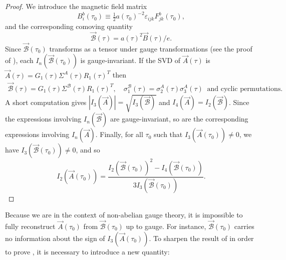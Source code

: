 \begin{proof}
We introduce the magnetic field matrix 
\begin{equation}
B_{i}^{b}(\tau_{0})\equiv\tfrac{1}{2}a(\tau_{0})^{-2}\varepsilon_{ijk}F_{jk}^{b}(\tau_{0}),\label{eq:B-def}
\end{equation}
 and the corresponding comoving quantity 
\begin{equation}
\vec{\mathcal{B}}(\tau)=a(\tau)^{2}\vec{B}(\tau)/e.\label{eq:cal-B}
\end{equation}
Since $\vec{\mathcal{B}}(\tau_{0})$ transforms as a tensor under gauge transformations (see the proof of ), each $I_{n}(\vec{\mathcal{B}}(\tau_{0}))$ is gauge-invariant. If the SVD of $\vec{A}(\tau)$ is $\vec{A}(\tau)=G_{1}(\tau)\Sigma^{A}(\tau)R_{1}(\tau)^{T}$ then
\begin{gather}
\vec{\mathcal{B}}(\tau)=G_{1}(\tau)\Sigma^{\mathcal{B}}(\tau)R_{1}(\tau)^{T},\quad\sigma_{1}^{\mathcal{B}}(\tau)=\sigma_{2}^{A}(\tau)\sigma_{3}^{A}(\tau)\ \textrm{ and cyclic permutations}.\label{eq:SV-AB}
\end{gather}
A short computation gives $\left|I_{3}(\vec{A})\right|=\sqrt{I_{3}(\vec{\mathcal{B}})}$ and $I_{4}(\vec{A})=I_{2}(\vec{\mathcal{B}})$. Since the expressions involving $I_{n}(\vec{\mathcal{B}})$ are gauge-invariant, so are the corresponding expressions involving $I_{n}(\vec{A})$. Finally, for all $\tau_{0}$ such that $I_{3}(\vec{A}(\tau_{0}))\neq0$, we have $I_{3}(\vec{\mathcal{B}}(\tau_{0}))\neq0$, and so 
\[
I_{2}(\vec{A}(\tau_{0}))=\frac{I_{2}(\vec{\mathcal{B}}(\tau_{0}))^{2}-I_{4}(\vec{\mathcal{B}}(\tau_{0}))}{3I_{3}(\vec{\mathcal{B}}(\tau_{0}))}.
\]
\end{proof}
Because we are in the context of non-abelian gauge theory, it is impossible to fully reconstruct $\vec{A}(\tau_{0})$ from $\vec{\mathcal{B}}(\tau_{0})$ up to gauge. For instance, $\vec{\mathcal{B}}(\tau_{0})$ carries no information about the sign of $I_{3}(\vec{A}(\tau_{0}))$. To sharpen the result of  in order to prove , it is necessary to introduce a new quantity: 
